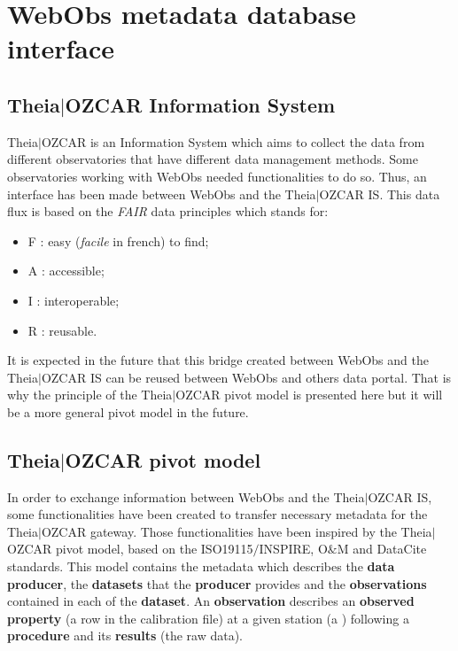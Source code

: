 
\chapter{WebObs metadata database interface} \label{metadata}



\section{Theia$\vert$OZCAR Information System} \label{theia}

Theia$\vert$OZCAR is an Information System which aims to collect the data from different observatories that have different data management methods. Some observatories working with WebObs needed functionalities to do so. Thus, an interface has been made between WebObs and the Theia$\vert$OZCAR IS. This data flux is based on the \textit{FAIR} data principles which stands for:

\begin{itemize}
\item 	 F : easy (\textit{facile} in french) to find;
\item 	 A : accessible;
\item 	 I : interoperable;
\item 	 R : reusable.
\end{itemize}

It is expected in the future that this bridge created between WebObs and the Theia$\vert$OZCAR IS can be reused between WebObs and others data portal. That is why the principle of the Theia$\vert$OZCAR pivot model is presented here but it will be a more general pivot model in the future.

\section{Theia$\vert$OZCAR pivot model}

In order to exchange information between WebObs and the Theia$\vert$OZCAR IS, some functionalities have been created to transfer necessary metadata for the Theia$\vert$OZCAR gateway. Those functionalities have been inspired by the Theia$\vert$OZCAR pivot model, based on the ISO19115$/$INSPIRE, O$\&$M and DataCite standards. This model contains the metadata which describes the \textbf{data producer}, the \textbf{datasets} that the \textbf{producer} provides and the \textbf{observations} contained in each of the \textbf{dataset}. An \textbf{observation} describes an \textbf{observed property} (a row in the calibration file) at a given {station} (a ) following a \textbf{procedure} and its \textbf{results} (the raw data). 


